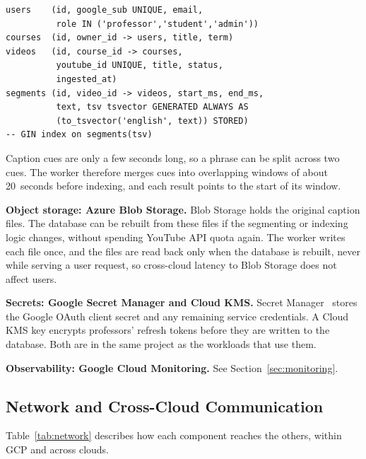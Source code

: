 \documentclass[conference]{IEEEtran}
\begin{document}
\begin{lstlisting}
users    (id, google_sub UNIQUE, email,
          role IN ('professor','student','admin'))
courses  (id, owner_id -> users, title, term)
videos   (id, course_id -> courses,
          youtube_id UNIQUE, title, status,
          ingested_at)
segments (id, video_id -> videos, start_ms, end_ms,
          text, tsv tsvector GENERATED ALWAYS AS
          (to_tsvector('english', text)) STORED)
-- GIN index on segments(tsv)
\end{lstlisting}

Caption cues are only a few seconds long, so a phrase can be split across two cues. The worker therefore merges cues into overlapping windows of about 20~seconds before indexing, and each result points to the start of its window.

\textbf{Object storage: Azure Blob Storage.} Blob Storage holds the original caption files. The database can be rebuilt from these files if the segmenting or indexing logic changes, without spending YouTube API quota again. The worker writes each file once, and the files are read back only when the database is rebuilt, never while serving a user request, so cross-cloud latency to Blob Storage does not affect users.

\textbf{Secrets: Google Secret Manager and Cloud KMS.} Secret Manager~\cite{secret-manager} stores the Google OAuth client secret and any remaining service credentials. A Cloud KMS key encrypts professors' refresh tokens before they are written to the database. Both are in the same project as the workloads that use them.

\textbf{Observability: Google Cloud Monitoring.} See Section~\ref{sec:monitoring}.

\subsection{Network and Cross-Cloud Communication}
Table~\ref{tab:network} describes how each component reaches the others, within GCP and across clouds.
\end{document}
